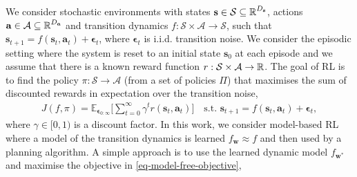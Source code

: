 \documentclass{article}
\newcommand{\state}{\ensuremath{\mathbf{s}}}
\newcommand{\action}{\ensuremath{\mathbf{a}}}
\newcommand{\noise}{\ensuremath{\bm\epsilon}}
\newcommand{\discount}{\ensuremath{\gamma}}
\newcommand{\stateDomain}{\ensuremath{\mathcal{S}}}
\newcommand{\actionDomain}{\ensuremath{\mathcal{A}}}
\newcommand{\policyDomain}{\ensuremath{\Pi}}
\newcommand{\rewardFn}{\ensuremath{r}}
\newcommand{\transitionFn}{\ensuremath{f}}
\newcommand{\policy}{\ensuremath{\pi}}
\begin{document}
We consider stochastic environments with states \(\state \in \stateDomain \subseteq \R^{D_{\state}} \),
actions \(\action \in \actionDomain \subseteq \R^{D_{\action}}\) and transition dynamics
\(\transitionFn: \stateDomain \times \actionDomain \rightarrow \stateDomain \), such that
$\state_{t+1} = \transitionFn(\state_{t}, \action_{t}) + \noise_{t}$, where  $\noise_{t}$
is i.i.d. transition noise.
We consider the episodic setting where the system is reset to an initial state $\state_{0}$ at each episode and we
assume that there is a known reward function $r : \stateDomain \times \actionDomain \rightarrow \R$.
The goal of RL is to find the policy \(\pi : \stateDomain \rightarrow \actionDomain\)
(from a set of policies $\Pi$) that maximises the sum of discounted rewards
in expectation over the transition noise,
\begin{align} \label{eq-model-free-objective}
J(\transitionFn, \policy) = \mathbb{E}_{\noise_{0:\infty}} \bigg[ \sum_{t=0}^{\infty} \discount^{t} \rewardFn(\state_{t},\action_{t}) \bigg]
\quad \text{s.t. } \state_{t+1} = \transitionFn(\state_{t}, \action_{t}) + \noise_{t},
\end{align}
where $\gamma \in [0, 1)$ is a discount factor.
In this work, we consider model-based RL where a model of the transition dynamics is learned \(f_{\mathbf{w}} \approx \transitionFn\) and then used by a planning algorithm.
A simple approach is to use the learned dynamic model $f_{\mathbf{w}^{*}}$ and maximise the objective in \cref{eq-model-free-objective},
\end{document}
